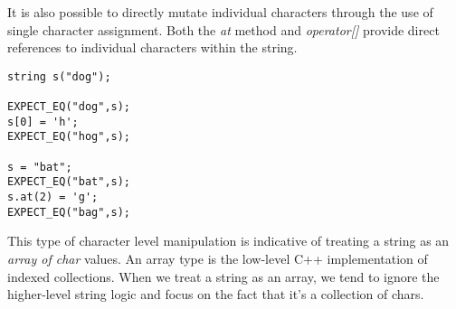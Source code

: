 \documentclass[]{tufte-handout}
\begin{document}
It is also possible to directly mutate individual characters through the use of single character assignment. Both the \textit{at} method and \textit{operator[]} provide direct references to individual characters within the string.
\begin{verbatim}
string s("dog");

EXPECT_EQ("dog",s);
s[0] = 'h';
EXPECT_EQ("hog",s);

s = "bat";
EXPECT_EQ("bat",s);
s.at(2) = 'g';
EXPECT_EQ("bag",s);
\end{verbatim}
This type of character level manipulation is indicative of treating a string as an \textit{array of char} values.  An array type is the low-level C++ implementation of indexed collections.  When we treat a string as an array, we tend to ignore the higher-level string logic and focus on the fact that it's a collection of chars. 
\end{document}
